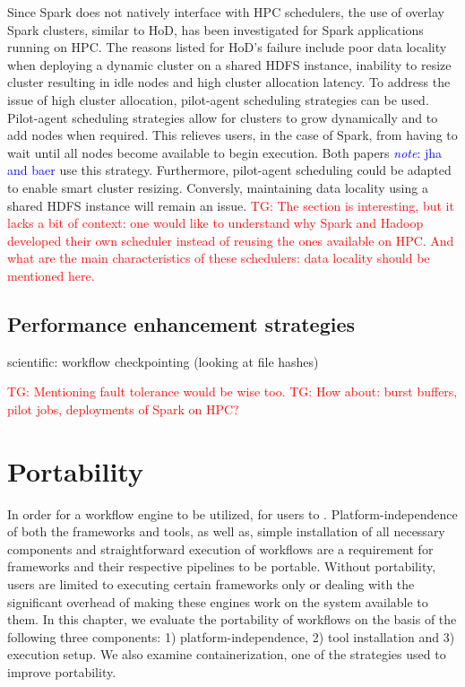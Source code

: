 \documentclass{report}
\newcommand{\note}[1]{\textcolor{blue}{\textit{note}: #1}}
\newcommand{\tristan}[1]{\textcolor{red}{TG: #1}}
\newcommand{\weird}[1]{\uwave{#1}}
\begin{document}
            Since Spark does not natively interface with HPC schedulers, 
            the use of overlay Spark clusters, similar to HoD, has been 
            investigated for Spark applications running on HPC. The reasons 
            listed for HoD's failure include poor 
            data locality when deploying a dynamic cluster on a shared HDFS 
            instance, inability to resize cluster resulting in idle nodes and 
            high cluster allocation latency. To address the issue of high 
            cluster allocation, pilot-agent scheduling strategies can be used.
            Pilot-agent scheduling strategies allow for clusters to grow 
            dynamically and to add nodes when required. This relieves users, 
            in the case of Spark, from having to wait until all nodes become 
            available to begin execution. Both papers \note{jha and baer} use 
            this strategy. Furthermore, pilot-agent scheduling could be adapted
            to enable smart cluster resizing. Conversly, maintaining data 
            locality using a shared HDFS instance will remain an issue. 
            \tristan{The section is interesting, but it lacks a bit of context: one would like to 
            understand why Spark and Hadoop developed their own scheduler instead of
            reusing the ones available on HPC. And what are the main characteristics of these
            schedulers: data locality should be mentioned here.}

        \section{Performance enhancement strategies}\label{other}
            scientific: workflow checkpointing (looking at file hashes)
            
            \tristan{Mentioning fault tolerance would be wise too.}
            \tristan{How about: burst buffers, pilot jobs, deployments of Spark on HPC?}
            
    \chapter{Portability}\label{portability}
        In order for a workflow engine to be utilized, \weird{it much be simple} for 
        users to \weird{install and execute the data}. Platform-independence of both 
        the frameworks and tools, as well as, simple installation of all 
        necessary components and straightforward execution of workflows  are a 
        requirement for frameworks and their respective pipelines to be 
        portable. Without portability, users are limited to executing certain
        frameworks only or dealing with the significant overhead of making 
        these engines work on the system available to them. In this chapter, 
        we evaluate the portability of workflows on the basis of the following
        three components: 1) platform-independence, 2) tool installation and
        3) execution setup. We also examine containerization, one of the 
        strategies used to improve portability.
\end{document}
